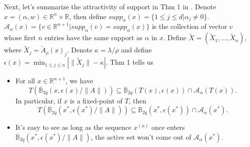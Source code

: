 \documentclass{article}
\begin{document}
Next, let's summarize the attractivity of support in Thm 1 in \cite{dohmatob2016local}. Denote $x = (\alpha, w)\in \mathbb{R}^n\times \mathbb{R}$, then define $supp_{\alpha}(x) = \{1\leq j \leq d| \alpha_j\neq 0\}$. $\mathcal{A}_{\alpha}(x)=\{v\in\mathbb{R}^{n+1}|supp_{\alpha}(v)= supp_{\alpha}(x)\}$ is the collection of vector $v$ whose first $n$ entries have the same support as $\alpha$ in $x$. Define $\widetilde{X} = (\widetilde{X}_1,\dots,\widetilde{X}_n)$, where $\widetilde{X}_j = \widetilde{A}_{\rho}(x)_j$. Denote $\kappa = \lambda/\rho$ and define $\epsilon(x)=\min_{1\leq j \leq n}\left|\|\widetilde{X}_j\|-\kappa\right|$. Thm 1 tells us
\begin{itemize}
    \item For all $x \in \mathbb{R}^{n+1}$, we have
    $$T\left(\overline{\mathbb{B}}_{2 q}(x, \epsilon(x) /\|A\|)\right) \subseteq \overline{\mathbb{B}}_{2 q}(T(x), \epsilon(x)) \cap \mathcal{A}_{\alpha}(T(x)).$$
    In particular, if $x$ is a fixed-point of $T$, then
    $$T\left(\overline{\mathbb{B}}_{2 q}\left(x^*, \epsilon\left(x^*\right) /\|A\|\right)\right) \subseteq \overline{\mathbb{B}}_{2 q}\left(x^*, \epsilon\left(x^*\right)\right) \cap \mathcal{A}_{\alpha}\left(x^*\right) .$$
    \item It's easy to see as long as the sequence $x^{(n)}$ once enters $\overline{\mathbb{B}}_{2 q}\left(x^*, \epsilon\left(x^*\right) /\|A\|\right)$, the active set won't come out of $\mathcal{A}_{\alpha}\left(x^*\right)$.
    
\end{itemize}







\printbibliography

\end{document}
